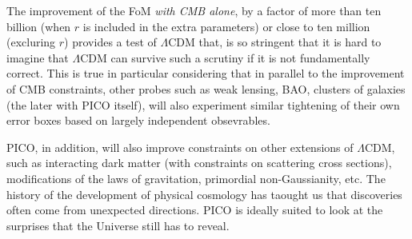 \documentclass[PICOReport.tex]{subfiles}
\begin{document}
The improvement of the FoM \emph{with CMB alone}, by a factor of more than ten billion (when $r$ is included in the extra parameters) or close to ten million (excluring $r$) provides a test of $\Lambda$CDM that, is so stringent that it is hard to imagine that $\Lambda$CDM can survive such a scrutiny if it is not fundamentally correct. This is true in particular considering that in parallel to the improvement of CMB constraints, other probes such as weak lensing, BAO, clusters of galaxies (the later with PICO itself), will also experiment similar tightening of their own error boxes based on largely independent obsevrables.

PICO, in addition, will also improve constraints on other extensions of $\Lambda$CDM, such as interacting dark matter (with constraints on scattering cross sections), modifications of the laws of gravitation, primordial non-Gaussianity, etc. The history of the development of physical cosmology has taought us that discoveries often come from unexpected directions. PICO is ideally suited to look at the surprises that the Universe still has to reveal.
\end{document}
